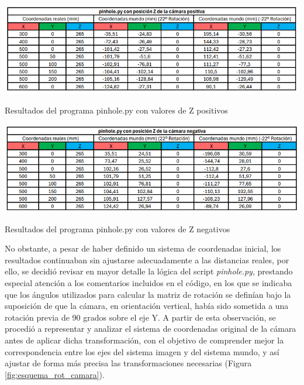   \begin{table}[H]
    \centering
    \begin{center}
      \includegraphics[width=150mm]{figs/pinhole con Z positiva.png}
    \end{center}
    \caption{Resultados del programa pinhole.py con valores de Z positivos}
    \label{tab:pinhole_Zpos}
  \end{table}
  
  
  \begin{table}[H]
   \centering
   \begin{center}
     \includegraphics[width=150mm]{figs/pinhole con Z negativa.png}
   \end{center}
   \caption{Resultados del programa pinhole.py con valores de Z negativos}
   \label{tab:pinhole_Zneg}
  \end{table}

No obstante, a pesar de haber definido un sistema de coordenadas inicial, los resultados continuaban sin ajustarse adecuadamente a las distancias reales, por ello, se decidió revisar en mayor detalle la lógica del script \textit{pinhole.py}, prestando especial atención a los comentarios incluidos en el código, en los que se indicaba que los ángulos utilizados para calcular la matriz de rotación se definían bajo la suposición de que la cámara, en orientación vertical, había sido sometida a una rotación previa de 90 grados sobre el eje Y. A partir de esta observación, se procedió a representar y analizar el sistema de coordenadas original de la cámara antes de aplicar dicha transformación, con el objetivo de comprender mejor la correspondencia entre los ejes del sistema imagen y del sistema mundo, y así ajustar de forma más precisa las transformaciones necesarias (Figura \ref{fig:esquema_rot_camara}). 

